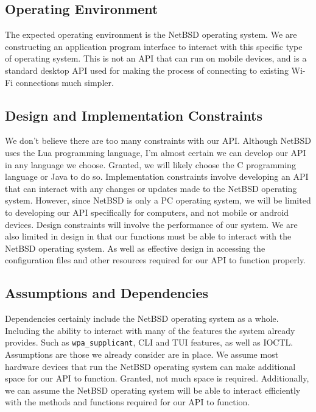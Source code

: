 \subsection{Operating Environment}

The expected operating environment is the NetBSD operating system. We are constructing an application program interface to 
interact with this specific type of operating system. This is not an API that can run on mobile devices, and is a standard 
desktop API used for making the process of connecting to existing Wi-Fi connections much simpler. 

\subsection{Design and Implementation Constraints}

We don’t believe there are too many constraints with our API. Although NetBSD uses the Lua programming language, I’m almost 
certain we can develop our API in any language we choose. Granted, we will likely choose the C programming language or Java 
to do so. Implementation constraints involve developing an API that can interact with any changes or updates made to the NetBSD 
operating system. However, since NetBSD is only a PC operating system, we will be limited to developing our API specifically for 
computers, and not mobile or android devices. Design constraints will involve the performance of our system. We are also limited 
in design in that our functions must be able to interact with the NetBSD operating system. As well as effective design in accessing 
the configuration files and other resources required for our API to function properly. 

\subsection{Assumptions and Dependencies}
%

Dependencies certainly include the NetBSD operating system as a whole. Including the ability to interact with many of the features 
the system already provides. Such as \texttt{wpa\_supplicant}, CLI and TUI features, as well as IOCTL. Assumptions are those 
we already consider are in place. We assume most hardware devices that run the NetBSD operating system can make additional space 
for our API to function. Granted, not much space is required. Additionally, we can assume the NetBSD operating system will be able 
to interact efficiently with the methods and functions required for our API to function. 




